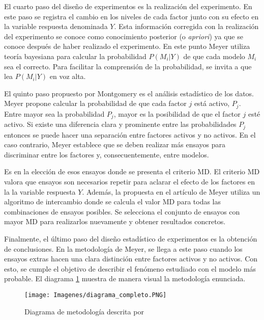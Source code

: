 El cuarto paso del diseño de experimentos es la realización del experimento. En este paso se registra el cambio en los niveles de cada factor junto con su efecto en la variable respuesta denominada $Y$. Esta información corregida con la realización del experimento se conoce como conocimiento posterior (o \textit{apriori}) ya que se conoce después de haber realizado el experimento. En este punto Meyer utiliza teoría bayesiana para calcular la probabilidad $P(M_i | Y)$ de que cada modelo $M_i$ sea el correcto. Para facilitar la comprensión de la probabilidad, se invita a que lea $P(M_i | Y)$ en voz alta. 

El quinto paso propuesto por Montgomery es el análisis estadístico de los datos. Meyer propone calcular la probabilidad de que cada factor $j$ está activo, $P_j$. Entre mayor sea la probabilidad $P_j$, mayor es la posibilidad de que el factor $j$ esté activo. Si existe una diferencia clara y prominente entre las probabilidades $P_j$ entonces se puede hacer una separación entre factores activos y no activos. En el caso contrario, Meyer establece que se deben realizar más ensayos para discriminar entre los factores y, consecuentemente, entre modelos. 

Es en la elección de esos ensayos donde se presenta el criterio MD. El criterio MD valora que ensayos son necesarios repetir para aclarar el efecto de los factores en la  la variable respuesta $Y$. Además, la propuesta en el artículo de Meyer utiliza un algoritmo de intercambio donde se calcula el valor MD para todas las combinaciones de ensayos posibles. Se selecciona el conjunto de ensayos con mayor MD para realizarlos nuevamente y obtener resultados concretos. 

Finalmente, el último paso del diseño estadístico de experimentos es la obtención de conclusiones. En la metodología de Meyer, se llega a este paso cuando los ensayos extras hacen una clara distinción entre factores activos y no activos. Con esto, se cumple el objetivo de describir el fenómeno estudiado con el modelo más probable. El diagrama \ref{diagrama_completo} muestra de manera visual la metodología enunciada. 

\begin{figure}[h]
	\begin{center}
		\texttt{[image: Imagenes/diagrama\_completo.PNG]}
		\caption{Diagrama de metodología descrita por \cite{meyer1996}}
		\label{diagrama_completo}
	\end{center}
\end{figure} 



